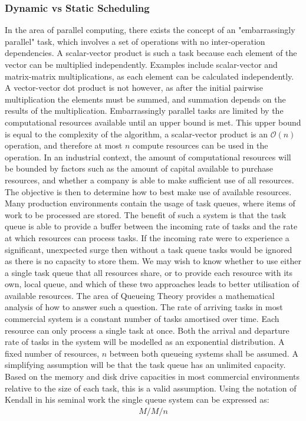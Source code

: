 \documentclass[12pt]{article}
\begin{document}
\subsubsection{Dynamic vs Static Scheduling} \label{dynamicStatic}
In the area of parallel computing, there exists the concept of an "embarrassingly parallel" task, which involves a set of operations with no inter-operation dependencies. A scalar-vector product is such a task because each element of the vector can be multiplied independently. Examples include scalar-vector and matrix-matrix multiplications, as each element can be calculated independently. A vector-vector dot product is not however, as after the initial pairwise multiplication the elements must be summed, and summation depends on the results of the multiplication. Embarrassingly parallel tasks are limited by the computational resources available until an upper bound is met. This upper bound is equal to the complexity of the algorithm, a scalar-vector product is an $\mathcal{O}(n)$ operation, and therefore at most $n$ compute resources can be used in the operation.
\newline
\newline
In an industrial context, the amount of computational resources will be bounded by factors such as the amount of capital available to purchase resources, and whether a company is able to make sufficient use of all resources. The objective is then to determine how to best make use of available resources. Many production environments contain the usage of task queues, where items of work to be processed are stored. The benefit of such a system is that the task queue is able to provide a buffer between the incoming rate of tasks and the rate at which resources can process tasks. If the incoming rate were to experience a significant, unexpected surge then without a task queue tasks would be ignored as there is no capacity to store them. We may wish to know whether to use either a single task queue that all resources share, or to provide each resource with its own, local queue, and which of these two approaches leads to better utilisation of available resources. The area of Queueing Theory \cite{queueing} provides a mathematical analysis of how to answer such a question.
\newline
\newline
The rate of arriving tasks in most commercial system is a constant number of tasks amortised over time. Each resource can only process a single task at once. Both the arrival and departure rate of tasks in the system will be modelled as an exponential distribution. A fixed number of resources, $n$ between both queueing systems shall be assumed. A simplifying assumption will be that the task queue has an unlimited capacity. Based on the memory and disk drive capacities in most commercial environments relative to the size of each task, this is a valid assumption. Using the notation of Kendall in his seminal work  \cite{kendall1953stochastic} the single queue system can be expressed as:
\newline
\begin{align*}
M / M / n
\end{align*}
\end{document}
